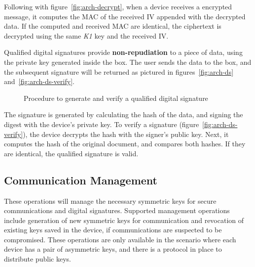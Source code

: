 Following with figure~\ref{fig:arch-decrypt}, when a device receives a encrypted message, it computes the MAC of the received \ac{IV} appended with the decrypted data. If the computed and received \ac{MAC} are identical, the ciphertext is decrypted using the same \textit{K1} key and the received \ac{IV}.

Qualified digital signatures provide \textbf{non-repudiation} to a piece of data, using the private key generated inside the box. The user sends the data to the box, and the subsequent signature will be returned as pictured in figures~\ref{fig:arch-ds} and~\ref{fig:arch-ds-verify}.

\begin{figure}[h]
	\centering     %
	\caption{Procedure to generate and verify a qualified digital signature}
\end{figure}

The signature is generated by calculating the hash of the data, and signing the digest with the device's private key. To verify a signature (figure~\ref{fig:arch-ds-verify}), the device decrypts the hash with the signer's public key. Next, it computes the hash of the original document, and compares both hashes. If they are identical, the qualified signature is valid.

\subsection{Communication Management}\label{chap:arch:ops:key}

These operations will manage the necessary symmetric keys for secure communications and digital signatures.
Supported management operations include generation of new symmetric keys for communication and revocation of existing keys saved in the device, if communications are suspected to be compromised.
These operations are only available in the scenario where each device has a pair of asymmetric keys, and there is a protocol in place to distribute public keys.

